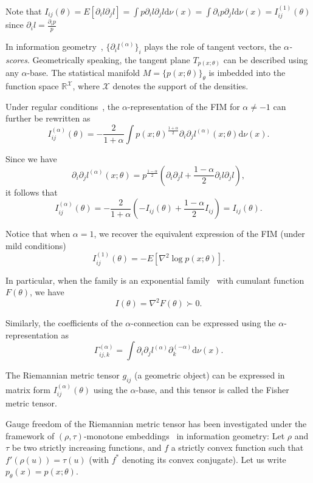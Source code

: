 \documentclass[11pt]{article}
\def\dnu{\mathrm{d}\nu}
\def\calX{\mathcal{X}}
\def\bbR{\mathbb{R}}
\begin{document}
Note that $I_{ij}(\theta)=E[\partial_i l\partial_j l]=\int p\partial_i l\partial_j l\dnu(x)=\int \partial_i p\partial_j l\dnu(x)=I_{ij}^{(1)}(\theta)$ since $\partial_i l=\frac{\partial_i p}{p}$

In information geometry~\cite{IG-2014}, $\{\partial_i l^{(\alpha)}\}_i$ plays the role of tangent vectors, the {\em $\alpha$-scores}.
Geometrically speaking, the tangent plane $T_{p(x;\theta)}$ can be described using any $\alpha$-base. 
The statistical manifold $M=\{p(x;\theta)\}_\theta$ is imbedded into the function space $\bbR^{\calX}$, where $\calX$ denotes the support of the densities.

Under regular conditions~\cite{CR-2013,IG-2014}, the $\alpha$-representation of the FIM for $\alpha\not=-1$ can further be rewritten as
\begin{equation}
I_{ij}^{(\alpha)}(\theta)=  -\frac{2}{1+\alpha} \int p(x;\theta)^{\frac{1+\alpha}{2}} \partial_i\partial_j l^{(\alpha)}(x;\theta)\dnu(x).
\end{equation}

Since we have 
$$
 \partial_i\partial_j l^{(\alpha)}(x;\theta) = p^{\frac{1-\alpha}{2}}\left(
\partial_i\partial_j l + \frac{1-\alpha}{2} \partial_i l\partial_j l
 \right),
$$
it follows that 
$$
I_{ij}^{(\alpha)}(\theta)= -\frac{2}{1+\alpha} \left(-I_{ij}(\theta)+ \frac{1-\alpha}{2} I_{ij}\right)=I_{ij}(\theta).
$$


Notice that when $\alpha=1$, we recover the equivalent expression of the FIM (under mild conditions)
$$
I_{ij}^{(1)}(\theta)= -E[\nabla^2 \log p(x;\theta)].
$$

In particular, when the family is an exponential family~\cite{EF-2009} with cumulant function $F(\theta)$, we have
$$
I(\theta)=\nabla^2 F(\theta)\succ 0.
$$

Similarly, the coefficients of the $\alpha$-connection can be expressed using the $\alpha$-representation as
$$
\Gamma_{ij,k}^{(\alpha)}= \int \partial_i\partial_j l^{(\alpha)}\partial_k^{(-\alpha)} \dnu(x).
$$

The Riemannian metric tensor $g_{ij}$ (a geometric object) can be expressed 
in matrix form $I_{ij}^{(\alpha)}(\theta)$ using the $\alpha$-base, and this tensor is called the Fisher metric tensor.

Gauge freedom of the Riemannian metric tensor has been investigated under the framework of  $(\rho,\tau)$-monotone embeddings~\cite{naudts2018rho} in information geometry:
Let $\rho$ and $\tau$ be two strictly increasing functions, and $f$ a strictly convex function such that $f'(\rho(u))=\tau(u)$ (with $f^*$ denoting its convex conjugate).
Let us write $p_\theta(x)=p(x;\theta)$. 
\end{document}
